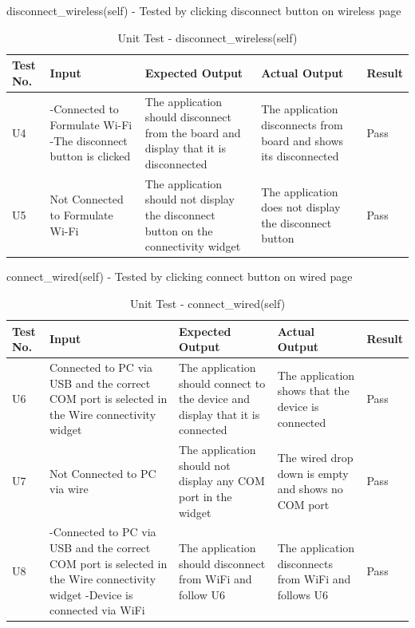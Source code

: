 \documentclass[12pt, titlepage]{article}
\begin{document}
disconnect\_wireless(self) - Tested by clicking disconnect button on wireless page
\begin{table}[H]
  \begin{tabular}{| p{} | p{}| p{}| p{}| p{}|}
    \hline
    \rowcolor[gray]{0.9}
    Test No. & Input & Expected Output & Actual Output & Result\\
    \hline
    U4 & -Connected to Formulate Wi-Fi -The disconnect button is clicked & The application should disconnect from the board and display that it is disconnected & The application disconnects from board and shows its disconnected & Pass \\
    \hline
    U5 & Not Connected to Formulate Wi-Fi  & The application should not display the disconnect button on the connectivity widget & The application does not display the disconnect button & Pass \\
    \hline
  \end{tabular}
  \caption{Unit Test - disconnect\_wireless(self)}
  \end{table}

  connect\_wired(self) - Tested by clicking connect button on wired page
  \begin{table}[H]
    \begin{tabular}{| p{} | p{}| p{}| p{}| p{}|}
      \hline
      \rowcolor[gray]{0.9}
      Test No. & Input & Expected Output & Actual Output & Result\\
      \hline
      U6 & Connected to PC via USB and the correct COM port is selected in the Wire connectivity widget & The application should connect to the device and display that it is connected & The application shows that the device is connected & Pass \\
      \hline
      U7 & Not Connected to PC via wire  & The application should not display any COM port in the widget & The wired drop down is empty and shows no COM port & Pass \\
      \hline
      U8 & -Connected to PC via USB and the correct COM port is selected in the Wire connectivity widget -Device is connected via WiFi & The application should disconnect from WiFi and follow U6 & The application disconnects from WiFi and follows U6 & Pass \\
      \hline
    \end{tabular}
    \caption{Unit Test - connect\_wired(self)}
    \end{table}
  
\end{document}
